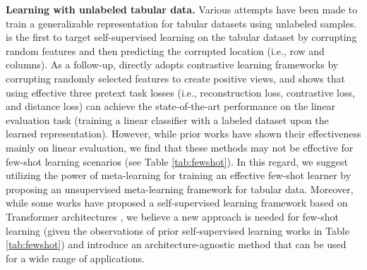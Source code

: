 \textbf{Learning with unlabeled tabular data.} Various attempts have been made to train a generalizable representation for tabular datasets using unlabeled samples. \cite{yoon2020vime} is the first to target self-supervised learning on the tabular dataset by corrupting random features and then predicting the corrupted location (i.e., row and columns). As a follow-up, \cite{bahri2021scarf} directly adopts contrastive learning frameworks \citep{chen2020simclr} by corrupting randomly selected features to create positive views, and \cite{ucar2021subtab} shows that using effective three pretext task losses (i.e., reconstruction loss, contrastive loss, and distance loss) can achieve the state-of-the-art performance on the linear evaluation task (training a linear classifier with a labeled dataset upon the learned representation). However, while prior works have shown their effectiveness mainly on linear evaluation, we find that these methods may not be effective for few-shot learning scenarios (see Table \ref{tab:fewshot}). In this regard, we suggest utilizing the power of meta-learning for training an effective few-shot learner by proposing an unsupervised meta-learning framework for tabular data. Moreover, while some works have proposed a self-supervised learning framework \citep{somepalli2021saint,majmundar2022met} based on Transformer architectures \citep{vaswani2017attention}, we believe a new approach is needed for few-shot learning (given the observations of prior self-supervised learning works in Table \ref{tab:fewshot}) and introduce an architecture-agnostic method that can be used for a wide range of applications.


